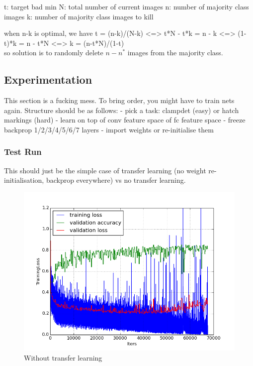 \documentclass[a4paper,11pt]{article}
\begin{document}
t: target bad min
N: total number of current images
n: number of majority class images
k: number of majority class images to kill

when n-k is optimal, we have t = (n-k)/(N-k)
<=> t*N - t*k = n - k
<=> (1-t)*k = n - t*N
<=> k = (n-t*N)/(1-t) \\

so solution is to randomly delete $n - n^{*}$ images from the majority class. \\


\subsection{Experimentation}

This section is a fucking mess. To bring order, you might have to train nets again. Structure should be as follows:
- pick a task: clampdet (easy) or hatch markings (hard)
- learn on top of conv feature space of fc feature space
- freeze backprop 1/2/3/4/5/6/7 layers
- import weights or re-initialise them

\subsubsection{Test Run}

This should just be the simple case of transfer learning (no weight re-initialisation, backprop everywhere) vs no transfer learning. 

\begin{figure}[h!]
	\centering
	\includegraphics[scale=0.5]{images/plot_clampdet_tl_wout.png}
	\caption{Without transfer learning}
\end{figure}
\end{document}
